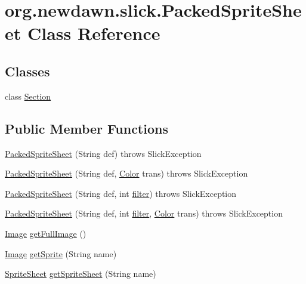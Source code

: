 \hypertarget{classorg_1_1newdawn_1_1slick_1_1_packed_sprite_sheet}{}\section{org.\+newdawn.\+slick.\+Packed\+Sprite\+Sheet Class Reference}
\label{classorg_1_1newdawn_1_1slick_1_1_packed_sprite_sheet}
\subsection*{Classes}
\begin{DoxyCompactItemize}
\item 
class \mbox{\hyperlink{classorg_1_1newdawn_1_1slick_1_1_packed_sprite_sheet_1_1_section}{Section}}
\end{DoxyCompactItemize}
\subsection*{Public Member Functions}
\begin{DoxyCompactItemize}
\item 
\mbox{\hyperlink{classorg_1_1newdawn_1_1slick_1_1_packed_sprite_sheet_acf930c67e88ddf2cccb7d0da3f8a2801}{Packed\+Sprite\+Sheet}} (String def)  throws Slick\+Exception 
\item 
\mbox{\hyperlink{classorg_1_1newdawn_1_1slick_1_1_packed_sprite_sheet_a23c64c2515b40bfee62d5b12b6dd36df}{Packed\+Sprite\+Sheet}} (String def, \mbox{\hyperlink{classorg_1_1newdawn_1_1slick_1_1_color}{Color}} trans)  throws Slick\+Exception 
\item 
\mbox{\hyperlink{classorg_1_1newdawn_1_1slick_1_1_packed_sprite_sheet_ae6cbc529dc62ad4ed721ec2ee60e7290}{Packed\+Sprite\+Sheet}} (String def, int \mbox{\hyperlink{classorg_1_1newdawn_1_1slick_1_1_packed_sprite_sheet_a03daeb71e62c853200c961868ce8468a}{filter}})  throws Slick\+Exception 
\item 
\mbox{\hyperlink{classorg_1_1newdawn_1_1slick_1_1_packed_sprite_sheet_accda07b70179c28005ed54091408560e}{Packed\+Sprite\+Sheet}} (String def, int \mbox{\hyperlink{classorg_1_1newdawn_1_1slick_1_1_packed_sprite_sheet_a03daeb71e62c853200c961868ce8468a}{filter}}, \mbox{\hyperlink{classorg_1_1newdawn_1_1slick_1_1_color}{Color}} trans)  throws Slick\+Exception 
\item 
\mbox{\hyperlink{classorg_1_1newdawn_1_1slick_1_1_image}{Image}} \mbox{\hyperlink{classorg_1_1newdawn_1_1slick_1_1_packed_sprite_sheet_a1190137f4f8779a722d6a1a56e1c95f2}{get\+Full\+Image}} ()
\item 
\mbox{\hyperlink{classorg_1_1newdawn_1_1slick_1_1_image}{Image}} \mbox{\hyperlink{classorg_1_1newdawn_1_1slick_1_1_packed_sprite_sheet_ac3ba876d0be75c93724ebe035787041e}{get\+Sprite}} (String name)
\item 
\mbox{\hyperlink{classorg_1_1newdawn_1_1slick_1_1_sprite_sheet}{Sprite\+Sheet}} \mbox{\hyperlink{classorg_1_1newdawn_1_1slick_1_1_packed_sprite_sheet_ad7e059c2e511ac079d6823158e1c6833}{get\+Sprite\+Sheet}} (String name)
\end{DoxyCompactItemize}
